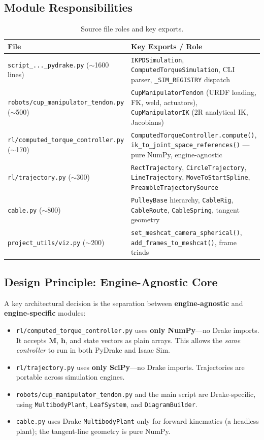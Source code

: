 \documentclass[11pt,a4paper]{article}
\newcommand{\bM}{\bm{M}}
\newcommand{\bh}{\bm{h}}
\begin{document}
\subsection{Module Responsibilities}

\begin{table}[H]
\centering
\caption{Source file roles and key exports.}
\begin{tabular}{p{5.8cm}p{8cm}}
\toprule
\textbf{File} & \textbf{Key Exports / Role} \\
\midrule
\texttt{script\_...\_pydrake.py} ($\sim$1600 lines) &
    \texttt{IKPDSimulation}, \texttt{ComputedTorqueSimulation}, CLI parser, \texttt{\_SIM\_REGISTRY} dispatch \\
\texttt{robots/cup\_manipulator\_tendon.py} ($\sim$500) &
    \texttt{CupManipulatorTendon} (URDF loading, FK, weld, actuators), \texttt{CupManipulatorIK} (2R analytical IK, Jacobians) \\
\texttt{rl/computed\_torque\_controller.py} ($\sim$170) &
    \texttt{ComputedTorqueController.compute()}, \texttt{ik\_to\_joint\_space\_references()} --- pure NumPy, engine-agnostic \\
\texttt{rl/trajectory.py} ($\sim$300) &
    \texttt{RectTrajectory}, \texttt{CircleTrajectory}, \texttt{LineTrajectory}, \texttt{MoveToStartSpline}, \texttt{PreambleTrajectorySource} \\
\texttt{cable.py} ($\sim$800) &
    \texttt{PulleyBase} hierarchy, \texttt{CableRig}, \texttt{CableRoute}, \texttt{CableSpring}, tangent geometry \\
\texttt{project\_utils/viz.py} ($\sim$200) &
    \texttt{set\_meshcat\_camera\_spherical()}, \texttt{add\_frames\_to\_meshcat()}, frame triads \\
\bottomrule
\end{tabular}
\end{table}

\subsection{Design Principle: Engine-Agnostic Core}

A key architectural decision is the separation between \textbf{engine-agnostic} and \textbf{engine-specific} modules:

\begin{itemize}[leftmargin=2em]
    \item \texttt{rl/computed\_torque\_controller.py} uses \textbf{only NumPy}---no Drake imports.  It accepts $\bM$, $\bh$, and state vectors as plain arrays.  This allows the \emph{same controller} to run in both PyDrake and Isaac Sim.
    \item \texttt{rl/trajectory.py} uses \textbf{only SciPy}---no Drake imports.  Trajectories are portable across simulation engines.
    \item \texttt{robots/cup\_manipulator\_tendon.py} and the main script are Drake-specific, using \texttt{MultibodyPlant}, \texttt{LeafSystem}, and \texttt{DiagramBuilder}.
    \item \texttt{cable.py} uses Drake \texttt{MultibodyPlant} only for forward kinematics (a headless plant); the tangent-line geometry is pure NumPy.
\end{itemize}
\end{document}
